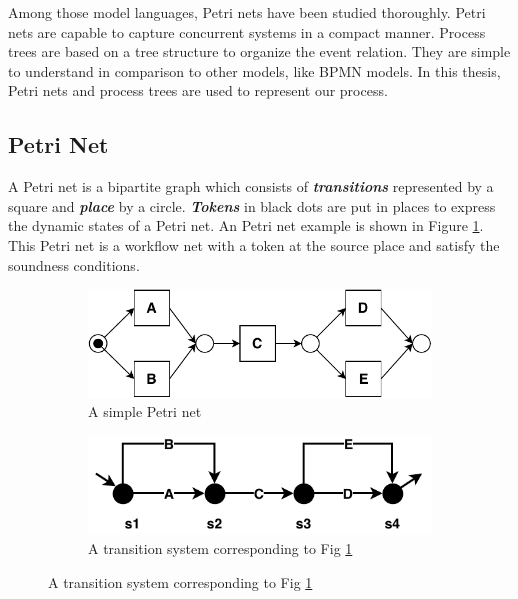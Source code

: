 Among those model languages, Petri nets have been studied thoroughly. Petri nets are capable to capture concurrent systems in a compact manner. Process trees are based on a tree structure to organize the event relation. They are simple to understand in comparison to other models, like BPMN models. In this thesis, Petri nets and process trees are used to represent our process.
\subsection{Petri Net}
A Petri net is a bipartite graph which consists of \textbf{\emph{transitions}} represented by a square and \textbf{\emph{place}} by a circle. \textbf{\emph{Tokens}} in black dots are put in places to express the dynamic states of a Petri net. An Petri net example is shown in Figure \ref{fig:pn-seq-2}. This Petri net is a workflow net with a token at the source place and satisfy the soundness conditions.  
\begin{figure}[!h]
	\centering
	\begin{subfigure}[b]{0.45\textwidth}
		\centering
		\includegraphics[width=\linewidth]{figures/preliminary/simple-petrinet.pdf}
		\caption{A simple Petri net}
		\label{fig:pn-seq-2}
	\end{subfigure}%
	\quad
	\begin{subfigure}[b]{0.5\textwidth}
		\centering
		\includegraphics[width=\linewidth]{figures/preliminary/transition-system.pdf}
		\caption{A transition system corresponding to Fig \ref{fig:pn-seq-2}}
		\label{fig:ts-model}
	\end{subfigure}%
	\label{fig:pn-ts}
\end{figure}  

